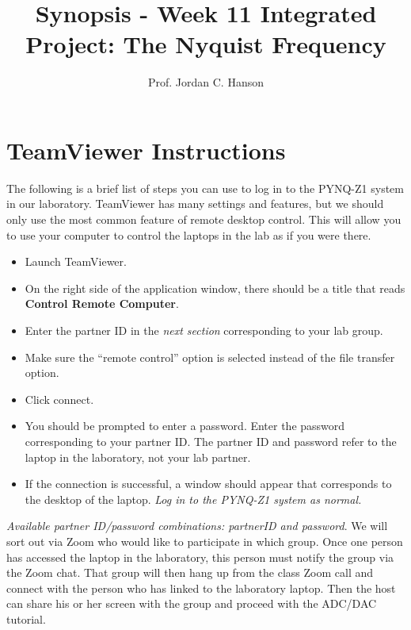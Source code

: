 \documentclass{article}
\begin{document}
\title{Synopsis - Week 11 Integrated Project: The Nyquist Frequency}
\author{Prof. Jordan C. Hanson}

\maketitle

\section{TeamViewer Instructions}

The following is a brief list of steps you can use to log in to the PYNQ-Z1 system in our laboratory.  TeamViewer has many settings and features, but we should only use the most common feature of remote desktop control.  This will allow you to use your computer to control the laptops in the lab as if you were there.

\begin{itemize}
\item Launch TeamViewer.
\item On the right side of the application window, there should be a title that reads \textbf{Control Remote Computer}.
\item Enter the partner ID in the \textit{next section} corresponding to your lab group.
\item Make sure the ``remote control'' option is selected instead of the file transfer option.
\item Click connect.
\item You should be prompted to enter a password.  Enter the password corresponding to your partner ID.  The partner ID and password refer to the laptop in the laboratory, not your lab partner.
\item If the connection is successful, a window should appear that corresponds to the desktop of the laptop.  \textit{Log in to the PYNQ-Z1 system as normal.}  
\end{itemize}

\textit{Available partner ID/password combinations: partnerID and password}.  We will sort out via Zoom who would like to participate in which group.  Once one person has accessed the laptop in the laboratory, this person must notify the group via the Zoom chat.  That group will then hang up from the class Zoom call and connect with the person who has linked to the laboratory laptop.  Then the host can share his or her screen with the group and proceed with the ADC/DAC tutorial.
\end{document}
